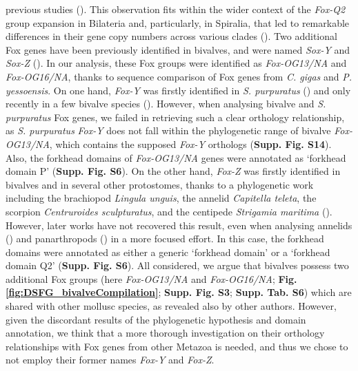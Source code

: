\documentclass[../main.tex]{subfiles}
\begin{document}
previous studies (\textbf{\cite{yang2014phylogeny,wu2020identification}}). This observation fits within the wider context of the \textit{Fox-Q2} group expansion in Bilateria and, particularly, in Spiralia, that led to remarkable differences in their gene copy numbers across various clades (\textbf{\cite{seudre2022fox}}). Two additional Fox genes have been previously identified in bivalves, and were named \textit{Sox-Y} and \textit{Sox-Z} (\textbf{\cite{yang2014phylogeny,wu2020identification}}). In our analysis, these Fox groups were identified as \textit{Fox-OG13/NA} and \textit{Fox-OG16/NA}, thanks to sequence comparison of Fox genes from \textit{C. gigas} and \textit{P. yessoensis}. On one hand, \textit{Fox-Y} was firstly identified in \textit{S. purpuratus} (\textbf{\cite{tu2006sea}}) and only recently in a few bivalve species (\textbf{\cite{yang2014phylogeny,wu2020identification}}). However, when analysing bivalve and \textit{S. purpuratus} Fox genes, we failed in retrieving such a clear orthology relationship, as \textit{S. purpuratus} \textit{Fox-Y} does not fall within the phylogenetic range of bivalve \textit{Fox-OG13/NA}, which contains the supposed \textit{Fox-Y} orthologs (\textbf{Supp. Fig. S14}). Also, the forkhead domains of \textit{Fox-OG13/NA} genes were annotated as ‘forkhead domain P’ (\textbf{Supp. Fig. S6}). On the other hand, \textit{Fox-Z} was firstly identified in bivalves and in several other protostomes, thanks to a phylogenetic work including the brachiopod \textit{Lingula unguis}, the annelid \textit{Capitella teleta}, the scorpion \textit{Centruroides sculpturatus}, and the centipede \textit{Strigamia maritima} (\textbf{\cite{wu2020identification}}). However, later works have not recovered this result, even when analysing annelids (\textbf{\cite{seudre2022fox}}) and panarthropods (\textbf{\cite{schomburg2022phylogenetic}}) in a more focused effort. In this case, the forkhead domains were annotated as either a generic ‘forkhead domain’ or a ‘forkhead domain Q2’ (\textbf{Supp. Fig. S6}). All considered, we argue that bivalves possess two additional Fox groups (here \textit{Fox-OG13/NA} and \textit{Fox-OG16/NA}; \textbf{Fig. \ref{fig:DSFG_bivalveCompilation}}; \textbf{Supp. Fig. S3}; \textbf{Supp. Tab. S6}) which are shared with other mollusc species, as revealed also by other authors. However, given the discordant results of the phylogenetic hypothesis and domain annotation, we think that a more thorough investigation on their orthology relationships with Fox genes from other Metazoa is needed, and thus we chose to not employ their former names \textit{Fox-Y} and \textit{Fox-Z}.
\end{document}
